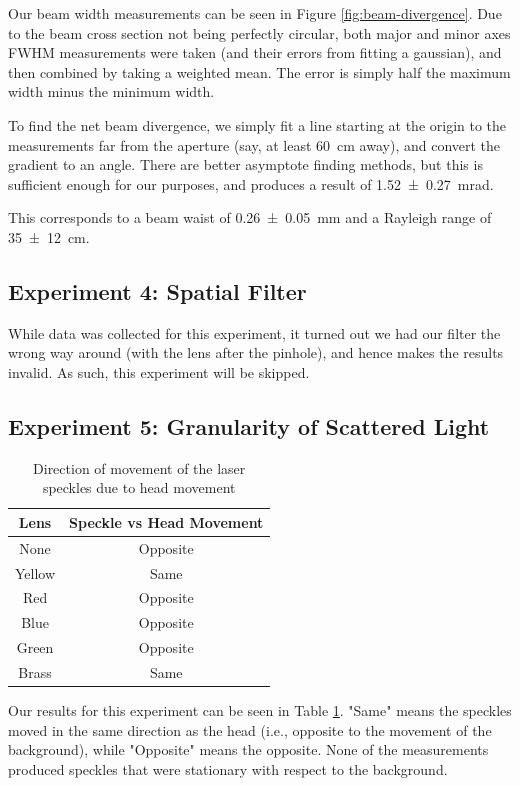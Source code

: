 \documentclass[a4paper]{scrartcl}
\begin{document}
Our beam width measurements can be seen in Figure \ref{fig:beam-divergence}. Due to the beam cross section not being perfectly circular, both major and minor axes FWHM measurements were taken (and their errors from fitting a gaussian), and then combined by taking a weighted mean. The error is simply half the maximum width minus the minimum width.

To find the net beam divergence, we simply fit a line starting at the origin to the measurements far from the aperture (say, at least \SI{60}{\centi\metre} away), and convert the gradient to an angle. There are better asymptote finding methods, but this is sufficient enough for our purposes, and produces a result of \SI{1.52 \pm 0.27}{\milli\radian}.

This corresponds to a beam waist of \SI{0.26 \pm 0.05}{\milli\metre} and a Rayleigh range of \SI{35 \pm 12}{\centi\metre}.

\subsection{Experiment 4: Spatial Filter}
While data was collected for this experiment, it turned out we had our filter the wrong way around (with the lens after the pinhole), and hence makes the results invalid. As such, this experiment will be skipped.

\subsection{Experiment 5: Granularity of Scattered Light}
\begin{table}
    \centering
    \begin{tabular}{c | c}
        Lens & Speckle vs Head Movement \\
        \hline
        None & Opposite \\
        Yellow & Same \\
        Red & Opposite \\
        Blue & Opposite \\
        Green & Opposite \\
        Brass & Same
    \end{tabular}
    \caption{Direction of movement of the laser speckles due to head movement}
    \label{tab:speckles}
\end{table}
Our results for this experiment can be seen in Table \ref{tab:speckles}. "Same" means the speckles moved in the same direction as the head (i.e., opposite to the movement of the background), while "Opposite" means the opposite. None of the measurements produced speckles that were stationary with respect to the background.
\end{document}
